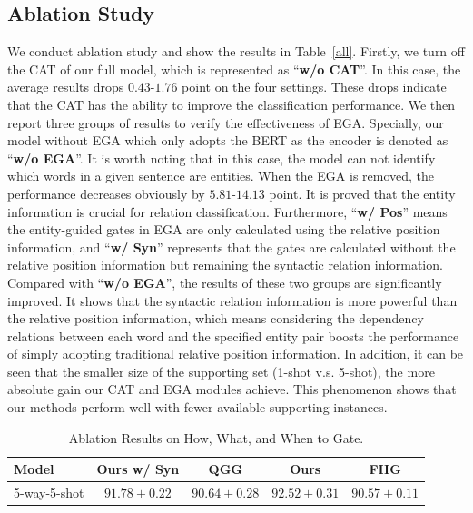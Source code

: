 \documentclass[11pt]{article}
\begin{document}
\subsection{Ablation Study}
We conduct ablation study and show the results in Table~\ref{all}.
Firstly, we turn off the CAT of our full model, which is represented as ``\textbf{w/o CAT}''.
In this case, the average results drops $0.43$-$1.76$ point on the four settings.
These drops indicate that the CAT has the ability to improve the classification performance.
We then report three groups of results to verify the effectiveness of EGA.
Specially, our model without EGA which only adopts the BERT as the encoder is denoted as ``\textbf{w/o EGA}''.
It is worth noting that in this case, the model can not identify which words in a given sentence are entities.
When the EGA is removed, the performance decreases obviously by $5.81$-$14.13$ point.
It is proved that the entity information is crucial for relation classification.
Furthermore, ``\textbf{w/ Pos}'' means the entity-guided gates in EGA are only calculated using the relative position information, and ``\textbf{w/ Syn}'' represents that the gates are calculated without the relative position information but remaining the syntactic relation information. Compared with ``\textbf{w/o EGA}'', the results of these two groups are significantly improved.
It shows that the syntactic relation information is more powerful than the relative position information, which means considering the dependency relations between each word and the  specified entity pair boosts the performance of simply adopting traditional relative position information.
In addition, it can be seen that the smaller size of the supporting set (1-shot v.s. 5-shot), the more absolute gain our CAT and EGA modules achieve.
This phenomenon shows that our methods perform well with fewer available supporting instances.
\begin{table}[h]
  \centering
  \begin{tabular}{l|c|c|c|c}
    \toprule
         Model   & Ours w/ Syn & QGG & Ours & FHG\\
        \midrule
    \midrule
        5-way-5-shot   & $91.78\pm0.22$ & $90.64 \pm 0.28$ & $92.52 \pm 0.31$ &  $90.57 \pm 0.11$\\
        \bottomrule

  \end{tabular}
  \caption{Ablation Results on How, What, and When to Gate.}
  \label{ablation}
    \vspace{-0.5cm}
\end{table}
\end{document}
